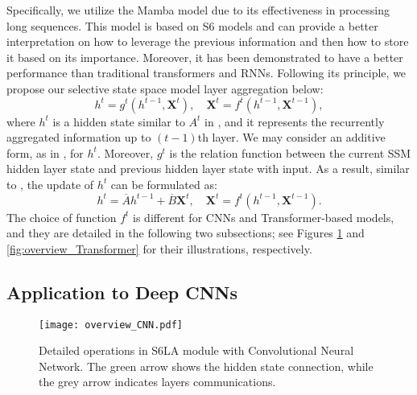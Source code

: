 Specifically, we utilize the Mamba model \citep{gu2023mamba} due to its effectiveness in processing long sequences.
This model is based on S6 models and can provide a better interpretation on how to leverage the previous information and then how to store it based on its importance. Moreover, it has been demonstrated to have a better performance than traditional transformers and RNNs.
Following its principle, we propose our selective state space model layer aggregation below:
\begin{equation}
    \label{S6_rec_ori}
        h^t = g^t(h^{t-1},\boldsymbol{X}^{t}),  \quad
        \boldsymbol{X}^t = f^t(h^{t-1},\boldsymbol{X}^{t-1}),
\end{equation}
where $h^t$ is a hidden state similar to $A^t$ in , and it represents the recurrently aggregated information up to $(t-1)$th layer.
We may consider an additive form, as in , for $h^t$. 
Moreover, $g^t$ is the relation function between the current SSM hidden layer state and previous hidden layer state with input. As a result, similar to , the update of $h^t$ can be formulated as:
\begin{equation}
    \label{S6_rec_up}
        h^t = \overline{A}h^{t-1} + \overline{B}\boldsymbol{X}^t,  \quad
        \boldsymbol{X}^{t} = f^t(h^{t-1},\boldsymbol{X}^{t-1}).
\end{equation}
The choice of function $f^t$ is different for CNNs and Transformer-based models, and they are detailed in the following two subsections; see Figures \ref{fig:overview_CNN} and  \ref{fig:overview_Transformer} for their illustrations, respectively. 


\subsection{Application to Deep CNNs}
\label{CNN_application}

\begin{figure}[t]
\begin{center}
\texttt{[image: overview\_CNN.pdf]}
\end{center}
Detailed operations in S6LA module with Convolutional Neural Network. The green arrow shows the hidden state connection, while the grey arrow indicates layers communications.
\label{fig:overview_CNN}
\end{figure}

